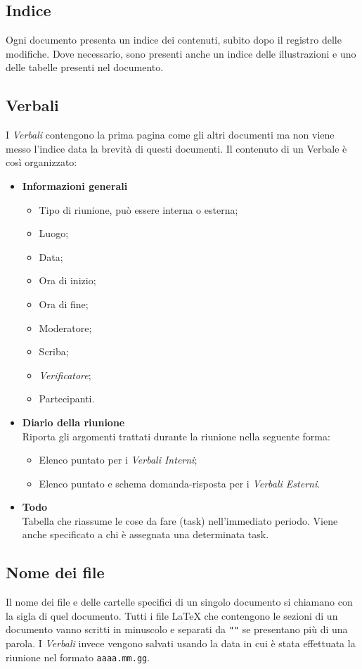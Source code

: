 \subsection{Indice}
Ogni documento presenta un indice dei contenuti, subito dopo il registro delle modifiche. Dove necessario, sono presenti anche un indice delle illustrazioni e uno delle tabelle presenti nel documento.
\subsection{Verbali}
I \textit{Verbali} contengono la prima pagina come gli altri documenti ma non viene messo l'indice data la brevità di questi documenti. Il contenuto di un Verbale è così organizzato:
\begin{itemize}
    \item \textbf{Informazioni generali}
    \begin{itemize}
        \item Tipo di riunione, può essere interna o esterna;
        \item Luogo;
        \item Data;
        \item Ora di inizio;
        \item Ora di fine;
        \item Moderatore;
        \item Scriba;
        \item \textit{Verificatore};
        \item Partecipanti.
    \end{itemize}
    \item \textbf{Diario della riunione}\\
    Riporta gli argomenti trattati durante la riunione nella seguente forma:
    \begin{itemize}
      \item Elenco puntato per i \textit{Verbali Interni};
      \item Elenco puntato e schema domanda-risposta per i \textit{Verbali Esterni}.
    \end{itemize}
    \item \textbf{Todo}\\
    Tabella che riassume le cose da fare (task) nell'immediato periodo. Viene anche specificato a chi è assegnata una determinata task.
\end{itemize}
\subsection{Nome dei file}
Il nome dei file e delle cartelle specifici di un singolo documento si chiamano con la sigla di quel documento. Tutti i file \LaTeX{} che contengono le sezioni di un documento vanno scritti in minuscolo e separati da \texttt{"\textunderscore"} se presentano più di una parola. I \textit{Verbali} invece vengono salvati usando la data in cui è stata effettuata la riunione nel formato \texttt{aaaa.mm.gg}.
